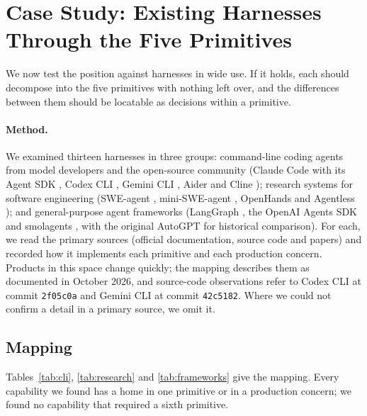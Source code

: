 \section{Case Study: Existing Harnesses Through the Five Primitives}
\label{sec:casestudy}

We now test the position against harnesses in wide use. If it holds, each should decompose into the five primitives with nothing left over, and the differences between them should be locatable as decisions within a primitive.

\paragraph{Method.} We examined thirteen harnesses in three groups: command-line coding agents from model developers and the open-source community (Claude Code with its Agent SDK \citep{claudecode,agentsdkblog}, Codex CLI \citep{codexcli}, Gemini CLI \citep{geminicli}, Aider \citep{aider} and Cline \citep{cline}); research systems for software engineering (SWE-agent \citep{yang2024sweagent}, mini-SWE-agent \citep{minisweagent}, OpenHands \citep{wang2025openhands,wang2025openhandssdk} and Agentless \citep{xia2024agentless}); and general-purpose agent frameworks (LangGraph \citep{langgraph}, the OpenAI Agents SDK \citep{openaiagentssdk} and smolagents \citep{smolagents}, with the original AutoGPT \citep{autogpt} for historical comparison). For each, we read the primary sources (official documentation, source code and papers) and recorded how it implements each primitive and each production concern. Products in this space change quickly; the mapping describes them as documented in October 2026, and source-code observations refer to Codex CLI at commit \texttt{2f05c0a} and Gemini CLI at commit \texttt{42c5182}. Where we could not confirm a detail in a primary source, we omit it.

\subsection{Mapping}

Tables~\ref{tab:cli}, \ref{tab:research} and \ref{tab:frameworks} give the mapping. Every capability we found has a home in one primitive or in a production concern; we found no capability that required a sixth primitive.

